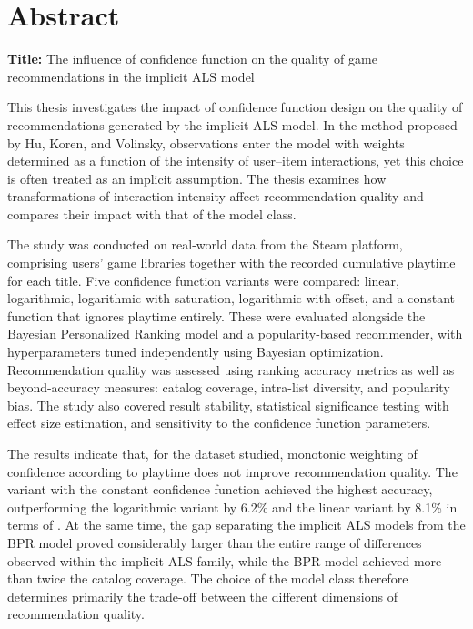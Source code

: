 \chapter*{Abstract}

\noindent\textbf{Title:} The influence of confidence function on the quality of game recommendations in the implicit ALS model

\vspace{0.8em}

This thesis investigates the impact of confidence function design on the quality of recommendations generated by the implicit ALS model. In the method proposed by Hu, Koren, and Volinsky, observations enter the model with weights determined as a function of the intensity of user--item interactions, yet this choice is often treated as an implicit assumption. The thesis examines how transformations of interaction intensity affect recommendation quality and compares their impact with that of the model class.

The study was conducted on real-world data from the Steam platform, comprising users' game libraries together with the recorded cumulative playtime for each title. Five confidence function variants were compared: linear, logarithmic, logarithmic with saturation, logarithmic with offset, and a constant function that ignores playtime entirely. These were evaluated alongside the Bayesian Personalized Ranking model and a popularity-based recommender, with hyperparameters tuned independently using Bayesian optimization. Recommendation quality was assessed using ranking accuracy metrics as well as beyond-accuracy measures: catalog coverage, intra-list diversity, and popularity bias. The study also covered result stability, statistical significance testing with effect size estimation, and sensitivity to the confidence function parameters.

The results indicate that, for the dataset studied, monotonic weighting of confidence according to playtime does not improve recommendation quality. The variant with the constant confidence function achieved the highest accuracy, outperforming the logarithmic variant by 6.2\% and the linear variant by 8.1\% in terms of \ndcg{}. At the same time, the gap separating the implicit ALS models from the BPR model proved considerably larger than the entire range of differences observed within the implicit ALS family, while the BPR model achieved more than twice the catalog coverage. The choice of the model class therefore determines primarily the trade-off between the different dimensions of recommendation quality.

